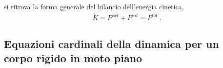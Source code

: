 \documentclass[letterpaper,10pt,italian]{jupyterBook}
\begin{document}
\sphinxAtStartPar
si ritrova la forma generale del bilancio dell’energia cinetica,
\begin{equation*}
\begin{split}\dot{K} = P^{ext} + P^{int} = P^{tot} \ .\end{split}
\end{equation*}
\sphinxstepscope


\subsection{Equazioni cardinali della dinamica per un corpo rigido in moto piano}
\label{\detokenize{ch/mechanics/dynamics-eom-proof-rigid-2d:equazioni-cardinali-della-dinamica-per-un-corpo-rigido-in-moto-piano}}\label{\detokenize{ch/mechanics/dynamics-eom-proof-rigid-2d:physics-hs-mechanics-dynamics-eom-rigid-2d}}\label{\detokenize{ch/mechanics/dynamics-eom-proof-rigid-2d::doc}}
\sphinxAtStartPar
{}

\sphinxstepscope
\end{document}

